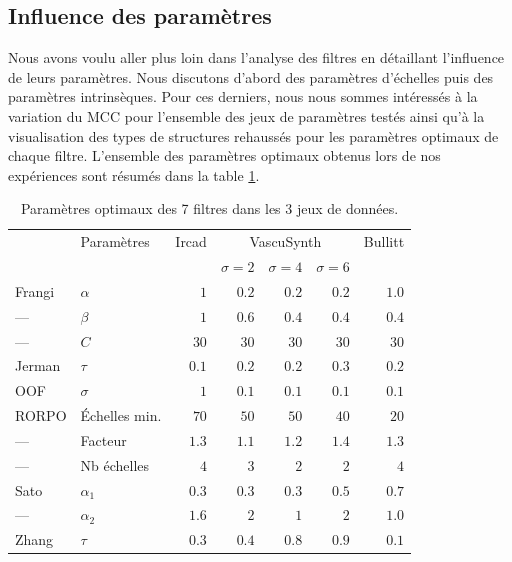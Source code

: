 \subsection{Influence des paramètres}
Nous avons voulu aller plus loin dans l'analyse des filtres en détaillant l'influence de leurs paramètres. Nous discutons d'abord des paramètres d'échelles puis des paramètres intrinsèques. Pour ces derniers, nous nous sommes intéressés à la variation du MCC pour l'ensemble des jeux de paramètres testés ainsi qu'à la visualisation des types de structures rehaussés pour les paramètres optimaux de chaque filtre. L'ensemble des paramètres optimaux obtenus lors de nos expériences sont résumés dans la table \ref{tab:optimal_parameters}.
\begin{table}[!ht]
  \begin{center}
  \caption{Paramètres optimaux des 7 filtres dans les 3 jeux de données.}
      \begin{tabular}{llrrrrr}
                          \hline
             & Paramètres  & Ircad       &  \multicolumn{3}{c}{VascuSynth}            &  Bullitt\\
             &   &         & $\sigma = 2$  & $\sigma = 4$ & $\sigma = 6$ &       \\
                         \hline
      Frangi &  $\alpha$  & $1$         & $0.2$     & $0.2$        & $0.2$           & $1.0$   \\
      ---    &  $\beta$   & $1$         & $0.6$     & $0.4$       & $0.4$           & $0.4$   \\
      ---    &  $C$       & $30$        & $30$       & $30$         & $30$            & $30$    \\
      Jerman & $\tau$     & $0.1$       & $0.2$     & $0.2$       & $0.3$          & $0.2$  \\
      OOF &  $\sigma$     & $1$         & $0.1$      & $0.1$        & $0.1$           & $0.1$   \\
      RORPO  & Échelles min.  & $70$        & $50$       & $50$         & $40$            & $20$    \\
      ---    & Facteur      & $1.3$       & $1.1$     & $1.2$       & $1.4$          & $1.3$  \\
      ---    &  Nb échelles  & $4$         & $3$        & $2$          & $2$             & $4$     \\
      Sato   & $\alpha_1$ & $0.3$       & $0.3$      & $0.3$        & $0.5$          & $0.7$   \\
      ---   & $\alpha_2$ & $1.6$       & $2$      & $1$        & $2$           & $1.0$   \\
      Zhang  & $\tau$     & $0.3$       & $0.4$     & $0.8$       & $0.9$          & $0.1$  \\
          \hline
      \end{tabular}
  \label{tab:optimal_parameters}
  \end{center}
\end{table}
